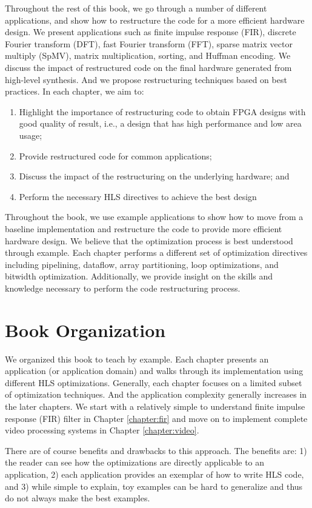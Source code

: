 Throughout the rest of this book, we go through a number of different applications, and show how to restructure the code for a more efficient hardware design. We present applications such as finite impulse response (FIR), discrete Fourier transform (DFT), fast Fourier transform (FFT), sparse matrix vector multiply (SpMV), matrix multiplication, sorting, and Huffman encoding. We discuss the impact of restructured code on the final hardware generated from high-level synthesis. And we propose restructuring techniques based on best practices. In each chapter, we aim to:
\begin{enumerate}
	\item Highlight the importance of restructuring code to obtain FPGA
          designs with good quality of result, i.e., a design that has high performance and low area usage;
	\item Provide restructured code for common applications;
	\item Discuss the impact of the restructuring on the underlying hardware; and
	\item Perform the necessary HLS directives to achieve the best design
\end{enumerate}
Throughout the book, we use example applications to show how to move from a baseline implementation and restructure the code to provide more efficient hardware design. We believe that the optimization process is best understood through example. Each chapter performs a different set of optimization directives including pipelining, dataflow, array partitioning, loop optimizations, and bitwidth optimization.  Additionally, we provide insight on the skills and knowledge necessary to perform the code restructuring process.

\section{Book Organization}
We organized this book to teach by example. Each chapter presents an application (or application domain) and walks through its implementation using  different HLS optimizations. Generally, each chapter focuses on a limited subset of optimization techniques. And the application complexity generally increases in the later chapters. We start with a relatively simple to understand finite impulse response (FIR) filter in Chapter \ref{chapter:fir} and move on to implement complete video processing systems in Chapter \ref{chapter:video}. 

There are of course benefits and drawbacks to this approach. The benefits are: 1) the reader can see how the optimizations are directly applicable to an application, 2) each application provides an exemplar of how to write HLS code, and 3) while simple to explain, toy examples can be hard to generalize and thus do not always make the best examples. 

